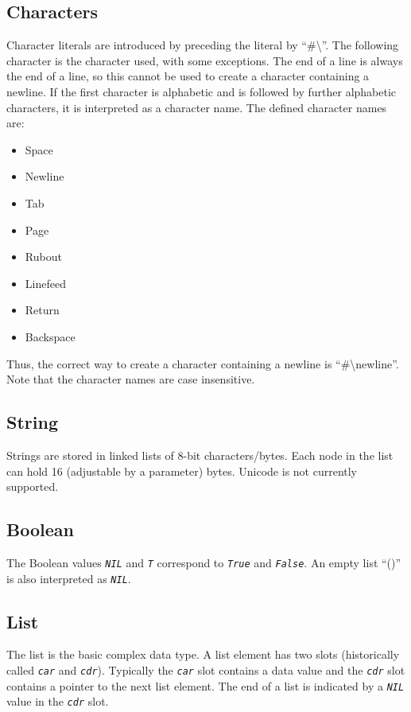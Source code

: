 \documentclass[10pt, openany]{book}
\newcommand{\constant}[1]{\emph{\texttt{#1}}}
\begin{document}
\subsection{Characters}
Character literals are introduced by preceding the literal by ``\#\textbackslash''.  The following character is the character used, with some exceptions.  The end of a line is always the end of a line, so this cannot be used to create a character containing a newline.  If the first character is alphabetic and is followed by further alphabetic characters, it is interpreted as a character name.  The defined character names are:
\begin{itemize}
\item Space
\item Newline
\item Tab
\item Page
\item Rubout
\item Linefeed
\item Return
\item Backspace
\end{itemize}
Thus, the correct way to create a character containing a newline is ``\#\textbackslash{}newline''.  Note that the character names are case insensitive.

\subsection{String}
Strings are stored in linked lists of 8-bit characters/bytes.  Each node in the list can hold 16 (adjustable by a parameter) bytes.  Unicode is not currently supported.

\subsection{Boolean}
The Boolean values \constant{NIL} and \constant{T} correspond to \constant{True} and \constant{False}.  An empty list ``()'' is also interpreted as \constant{NIL}.

\subsection{List}
The list is the basic complex data type.  A list element has two slots (historically called \constant{car} and \constant{cdr}).  Typically the \constant{car} slot contains a data value and the \constant{cdr} slot contains a pointer to the next list element.  The end of a list is indicated by a \constant{NIL} value in the \constant{cdr} slot.
\end{document}

